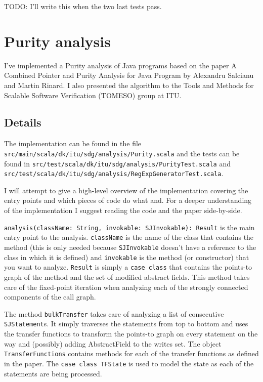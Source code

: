 \documentclass[11pt]{exam}
\begin{document}
TODO: I'll write this when the two last tests pass.

\newpage

\section{Purity analysis}

I've implemented a Purity analysis of Java programs based on the paper A Combined Pointer and Purity Analysis for Java Program by Alexandru Salcianu and Martin Rinard. I also presented the algorithm to the Tools and Methods for Scalable Software Verification (TOMESO) group at ITU.

\subsection{Details}

The implementation can be found in the file \texttt{src/main/scala/dk/itu/sdg/analysis/Purity.scala} and the tests can be found in \texttt{src/test/scala/dk/itu/sdg/analysis/PurityTest.scala} and \texttt{src/test/scala/dk/itu/sdg/analysis/RegExpGeneratorTest.scala}. \newline

I will attempt to give a high-level overview of the implementation covering the entry points and which pieces of code do what and. For a deeper understanding of the implementation I suggest reading the code and the paper side-by-side. \newline

\texttt{analysis(className: String, invokable: SJInvokable): Result} is the main entry point to the analysis. \texttt{className} is the name of the class that contains the method (this is only needed because \texttt{SJInvokable} doesn't have a reference to the class in which it is defined) and \texttt{invokable} is the method (or constructor) that you want to analyze. \texttt{Result} is simply a \texttt{case class} that contains the points-to graph of the method and the set of modified abstract fields. This method takes care of the fixed-point iteration when analyzing each of the strongly connected components of the call graph. \newline

The method \texttt{bulkTransfer} takes care of analyzing a list of consecutive \texttt{SJStatement}s. It simply traverses the statements from top to bottom and uses the transfer functions to transform the points-to graph on every statement on the way and (possibly) adding AbstractField to the writes set. The object \texttt{TransferFunctions} contains methods for each of the transfer functions as defined in the paper. The \texttt{case class TFState} is used to model the state as each of the statements are being processed. \newline
\end{document}
